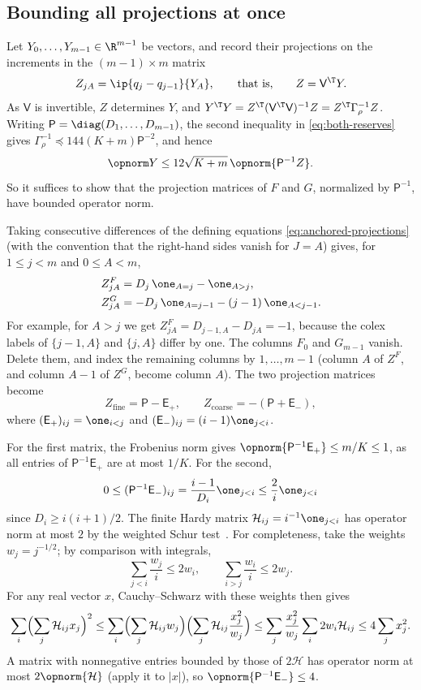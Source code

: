 \subsection{Bounding all projections at once}\label{sec:app-projections}

Let $Y_0,\dots,Y_{m-1}\in\R^{m-1}$ be vectors, and record their
projections on the increments in the $(m-1)\times m$ matrix
\[
 Z_{jA}=\ip{q_j-q_{j-1}}{Y_A},\qquad\text{that is,}\qquad Z=\mathsf V^\T Y.
\]
As $\mathsf V$ is invertible, $Z$ determines $Y$, and
$Y^\T Y=Z^\T(\mathsf V^\T\mathsf V)^{-1}Z=Z^\T\Gamma_\rho^{-1}Z$. Writing
$\mathsf P=\diag(D_1,\dots,D_{m-1})$, the second inequality in
\eqref{eq:both-reserves} gives
$\Gamma_\rho^{-1}\preceq144(K+m)\mathsf P^{-2}$, and hence
\begin{equation}\label{eq:whole-solve}
 \opnorm Y\le12\sqrt{K+m}\,\opnorm{\mathsf P^{-1}Z}.
\end{equation}
So it suffices to show that the projection matrices of $F$ and $G$,
normalized by $\mathsf P^{-1}$, have bounded operator norm.

Taking consecutive differences of the defining equations
\eqref{eq:anchored-projections} (with the convention that the right-hand
sides vanish for $J=A$) gives, for $1\le j<m$ and $0\le A<m$,
\begin{align*}
 Z^F_{jA}&=D_j\,\one_{A=j}-\one_{A>j},\\
 Z^G_{jA}&=-D_j\,\one_{A=j-1}-(j-1)\,\one_{A<j-1}.
\end{align*}
For example, for $A>j$ we get $Z^F_{jA}=D_{j-1,A}-D_{jA}=-1$, because the
colex labels of $\{j-1,A\}$ and $\{j,A\}$ differ by one. The columns $F_0$
and $G_{m-1}$ vanish. Delete them, and index the remaining columns by
$1,\dots,m-1$ (column $A$ of $Z^F$, and column $A-1$ of $Z^G$, become
column $A$). The two projection matrices become
\[
 Z_{\mathrm{fine}}=\mathsf P-\mathsf E_+,\qquad
 Z_{\mathrm{coarse}}=-(\mathsf P+\mathsf E_-),
\]
where $(\mathsf E_+)_{ij}=\one_{i<j}$ and
$(\mathsf E_-)_{ij}=(i-1)\one_{j<i}$.

For the first matrix, the Frobenius norm gives
$\opnorm{\mathsf P^{-1}\mathsf E_+}\le m/K\le1$, as all entries of
$\mathsf P^{-1}\mathsf E_+$ are at most $1/K$. For the second,
\[
 0\le(\mathsf P^{-1}\mathsf E_-)_{ij}
 =\frac{i-1}{D_i}\one_{j<i}
 \le\frac2i\one_{j<i}
\]
since $D_i\ge i(i+1)/2$. The finite Hardy matrix
$\mathcal H_{ij}=i^{-1}\one_{j<i}$ has operator norm at most $2$ by the
weighted Schur test~\cite{Schur,Sinnamon}. For completeness, take
the weights $w_j=j^{-1/2}$; by comparison with integrals,
\[
 \sum_{j<i}\frac{w_j}{i}\le2w_i,
 \qquad \sum_{i>j}\frac{w_i}{i}\le2w_j.
\]
For any real vector $x$, Cauchy--Schwarz with these weights then gives
\[
 \sum_i\Bigl(\sum_j \mathcal H_{ij}x_j\Bigr)^2
 \le\sum_i\Bigl(\sum_j\mathcal H_{ij}w_j\Bigr)
          \Bigl(\sum_j\mathcal H_{ij}\frac{x_j^2}{w_j}\Bigr)
 \le\sum_j\frac{x_j^2}{w_j}\sum_i2w_i\mathcal H_{ij}
 \le4\sum_jx_j^2.
\]
A matrix with nonnegative entries bounded by those of $2\mathcal H$ has
operator norm at most $2\opnorm{\mathcal H}$ (apply it to $|x|$), so
$\opnorm{\mathsf P^{-1}\mathsf E_-}\le4$.

